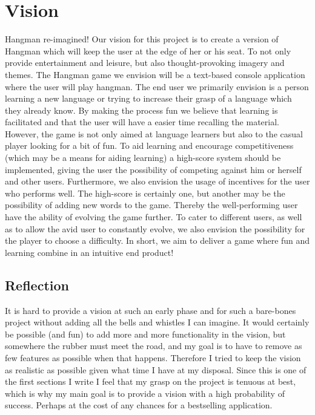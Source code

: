 \documentclass[12pt, letterpaper]{article}
\begin{document}
\section{Vision}
Hangman re-imagined! Our vision for this project is to create a version of Hangman which will keep the user at the edge of her or his seat. To not only provide entertainment and leisure, but also thought-provoking imagery and themes. 
\newline
\newline
 The Hangman game we envision will be a text-based console application where the user will play hangman. The end user we primarily envision is a person learning a new language or trying to increase their grasp of a language which they already know. By making the process fun we believe that learning is facilitated and that the user will have a easier time recalling the material. However, the game is not only aimed at language learners but also to the casual player looking for a bit of fun.
 \newline
 \newline
 To aid learning and encourage competitiveness (which may be a means for aiding learning) a high-score system should be implemented, giving the user the possibility of competing against him or herself and other users. Furthermore, we also envision the usage of incentives for the user who performs well. The high-score is certainly one, but another may be the possibility of adding new words to the game. Thereby the well-performing user have the ability of evolving the game further. To cater to different users, as well as to allow the avid user to constantly evolve, we also envision the possibility for the player to choose a difficulty.
 \newline
 \newline
  In short, we aim to deliver a game where fun and learning combine in an intuitive end product!
  \subsection{Reflection}
  It is hard to provide a vision at such an early phase and for such a bare-bones project without adding all the bells and whistles I can imagine. It would certainly be possible (and fun) to add more and more functionality in the vision, but somewhere the rubber must meet the road, and my goal is to have to remove as few features as possible when that happens. Therefore I tried to keep the vision as realistic as possible given what time I have at my disposal. Since this is one of the first sections I write I feel that my grasp on the project is tenuous at best, which is why my main goal is to provide a vision with a high probability of success. Perhaps at the cost of any chances for a bestselling application.  
\end{document}
